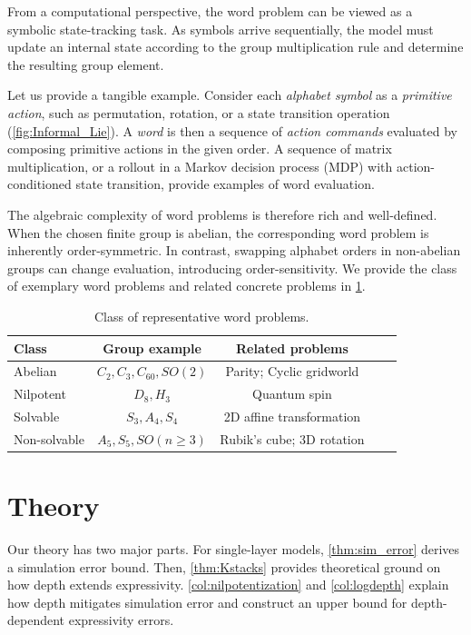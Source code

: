 \documentclass{article}
\theoremstyle{plain}
\theoremstyle{definition}
\theoremstyle{remark}
\begin{document}
From a computational perspective, the word problem can be viewed as a symbolic state-tracking task.
As symbols arrive sequentially, the model must update an internal state according to the group multiplication rule
and determine the resulting group element.

Let us provide a tangible example.
Consider each \emph{alphabet symbol} as a \emph{primitive action}, such as permutation, rotation, or a state transition operation (\cref{fig:Informal_Lie}).
A \emph{word} is then a sequence of \emph{action commands} evaluated by composing primitive actions in the given order.
A sequence of matrix multiplication, or a rollout in a Markov decision process (MDP) with action-conditioned state transition, provide examples of word evaluation.

The algebraic complexity of word problems is therefore rich and well-defined.
When the chosen finite group is abelian, the corresponding word problem is inherently order-symmetric.
In contrast, swapping alphabet orders in non-abelian groups can change evaluation,
introducing order-sensitivity.
We provide the class of exemplary word problems and related concrete problems in \cref{tab:words}.
\begin{table}[t]
\setlength{\tabcolsep}{0.3em}
  \caption{Class of representative word problems.}
  \vspace{-3mm}
  \label{tab:words}
  \begin{center}
    \begin{small}
        \begin{tabular}{lcccr}
          \toprule
          Class  & Group example         & Related problems\\
          \midrule
          Abelian    & $C_2, C_3, C_{60}, SO(2)$ & Parity; Cyclic gridworld \\ 
         Nilpotent & $D_8, H_3$ & Quantum spin \\
          Solvable    & $S_3, A_4, S_4$ & 2D affine transformation \\
          Non-solvable    & $A_5, S_5, SO(n\ge3)$ & Rubik's cube; 3D rotation\\
          \bottomrule
        \end{tabular}
    \end{small}
  \end{center}
  \vskip -0.1in
\end{table}

\section{Theory}
\label{sec:theory}
Our theory has two major parts.
For single-layer models, \cref{thm:sim_error} derives a simulation error bound.
Then, \cref{thm:Kstacks} provides theoretical ground on how depth extends expressivity.
\cref{col:nilpotentization} and \cref{col:logdepth}
explain how depth mitigates simulation error
and construct an upper bound for depth-dependent expressivity errors.
\end{document}
